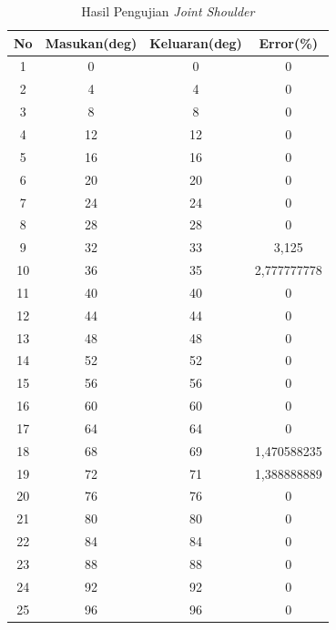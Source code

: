\begin{table}[!htbp]
	\small
	\centering
	\caption{Hasil Pengujian \textit{Joint Shoulder}}
	\label{tbl.jointshoulder}
	\begin{tabular}{|c|c|c|c|}
		\hline
		\rowcolor[HTML]{9B9B9B} 
		No & Masukan(deg) & Keluaran(deg) & Error(\%)      \\ \hline
		1  & 0       & 0        & 0           \\ \hline
		2  & 4       & 4        & 0           \\ \hline
		3  & 8       & 8        & 0           \\ \hline
		4  & 12      & 12       & 0           \\ \hline
		5  & 16      & 16       & 0           \\ \hline
		6  & 20      & 20       & 0           \\ \hline
		7  & 24      & 24       & 0           \\ \hline
		8  & 28      & 28       & 0           \\ \hline
		9  & 32      & 33       & 3,125       \\ \hline
		10 & 36      & 35       & 2,777777778 \\ \hline
		11 & 40      & 40       & 0           \\ \hline
		12 & 44      & 44       & 0           \\ \hline
		13 & 48      & 48       & 0           \\ \hline
		14 & 52      & 52       & 0           \\ \hline
		15 & 56      & 56       & 0           \\ \hline
		16 & 60      & 60       & 0           \\ \hline
		17 & 64      & 64       & 0           \\ \hline
		18 & 68      & 69       & 1,470588235 \\ \hline
		19 & 72      & 71       & 1,388888889 \\ \hline
		20 & 76      & 76       & 0           \\ \hline
		21 & 80      & 80       & 0           \\ \hline
		22 & 84      & 84       & 0           \\ \hline
		23 & 88      & 88       & 0           \\ \hline
		24 & 92      & 92       & 0           \\ \hline
		25 & 96      & 96       & 0           \\ \hline

\end{tabular}
\end{table}
